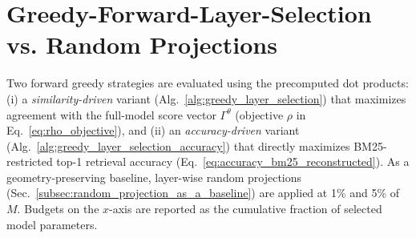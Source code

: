 \section{Greedy-Forward-Layer-Selection vs. Random Projections}\label{sec:greedy_vs_rp}
Two forward greedy strategies are evaluated using the precomputed dot products: (i) a \emph{similarity-driven} variant (Alg.~\ref{alg:greedy_layer_selection}) that maximizes agreement with the full-model score vector $\Gamma^\theta$ (objective $\rho$ in Eq.~\ref{eq:rho_objective}), and (ii) an \emph{accuracy-driven} variant (Alg.~\ref{alg:greedy_layer_selection_accuracy}) that directly maximizes BM25-restricted top-1 retrieval accuracy (Eq.~\ref{eq:accuracy_bm25_reconstructed}). As a geometry-preserving baseline, layer-wise random projections (Sec.~\ref{subsec:random_projection_as_a_baseline}) are applied at 1\% and 5\% of $M$. Budgets on the $x$-axis are reported as the cumulative fraction of selected model parameters.

